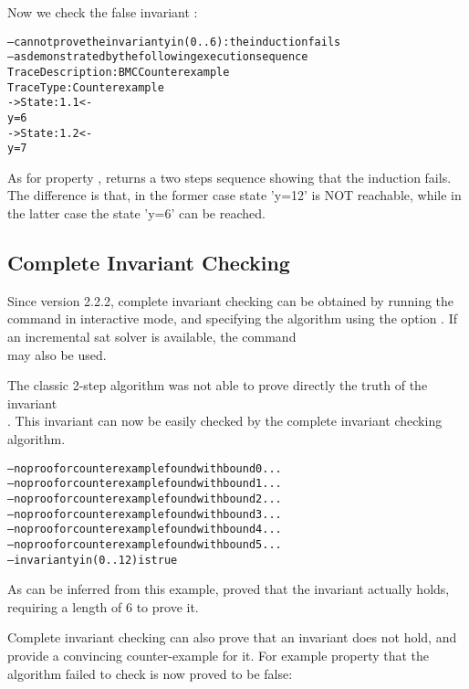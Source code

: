 \pagebreak[3]
Now we check the false invariant :
\begin{alltt}
-- cannot prove the invariant y in (0 .. 6) : the induction fails
-- as demonstrated by the following execution sequence
Trace Description: BMC Counterexample
Trace Type: Counterexample
-> State: 1.1 <-
  y = 6
-> State: 1.2 <-
  y = 7
\nusmvprompt
\end{alltt}
As for property , \nusmv returns a two steps
sequence showing that the induction fails. 
The difference is that, in the former case state 'y=12' is NOT reachable, while in the
latter case the state 'y=6' can be reached. 


\subsection{Complete Invariant Checking}

Since version 2.2.2, complete invariant checking can be obtained by
running the command  in interactive mode, and
specifying the algorithm  using the option
. If an incremental sat solver is available, the command \\
 may also be used.

The classic 2-step algorithm was not able to prove directly the truth
of the invariant \\
. This invariant can now be easily
checked by the complete invariant checking algorithm.

\begin{alltt}
\shellprompt {}
\nusmvprompt {}
\nusmvprompt {}
-- no proof or counterexample found with bound 0 ...
-- no proof or counterexample found with bound 1 ...
-- no proof or counterexample found with bound 2 ... 
-- no proof or counterexample found with bound 3 ...
-- no proof or counterexample found with bound 4 ... 
-- no proof or counterexample found with bound 5 ... 
-- invariant y in (0 .. 12)   is true
\nusmvprompt
\end{alltt}

As can be inferred from this example, \nusmv proved that the
invariant actually holds, requiring a length of 6 to prove it.

Complete invariant checking can also prove that an invariant does not
hold, and provide a convincing counter-example for it. For example
property  that the  algorithm failed to check
is now proved to be false:


